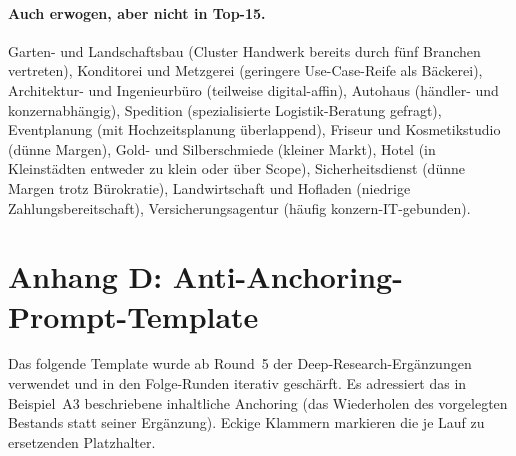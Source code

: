 \documentclass[a4paper,11pt]{article}
\begin{document}
\paragraph{Auch erwogen, aber nicht in Top-15.}
Garten- und Landschaftsbau (Cluster Handwerk bereits durch fünf
Branchen vertreten), Konditorei und Metzgerei (geringere
Use-Case-Reife als Bäckerei), Architektur- und Ingenieurbüro
(teilweise digital-affin), Autohaus (händler- und konzernabhängig),
Spedition (spezialisierte Logistik-Beratung gefragt), Eventplanung
(mit Hochzeitsplanung überlappend), Friseur und Kosmetikstudio (dünne
Margen), Gold- und Silberschmiede (kleiner Markt), Hotel (in
Klein\-städten entweder zu klein oder über Scope), Sicherheitsdienst
(dünne Margen trotz Bürokratie), Landwirtschaft und Hofladen (niedrige
Zahlungsbereitschaft), Versicherungsagentur (häufig
konzern-IT-gebunden).

\newpage

\section*{Anhang D: Anti-Anchoring-Prompt-Template}

Das folgende Template wurde ab Round~5 der Deep-Research-Ergänzungen
verwendet und in den Folge-Runden iterativ geschärft. Es adressiert
das in Beispiel~A3 beschriebene inhaltliche Anchoring (das Wiederholen
des vorgelegten Bestands statt seiner Ergänzung). Eckige Klammern
markieren die je Lauf zu ersetzenden Platzhalter.
\end{document}
